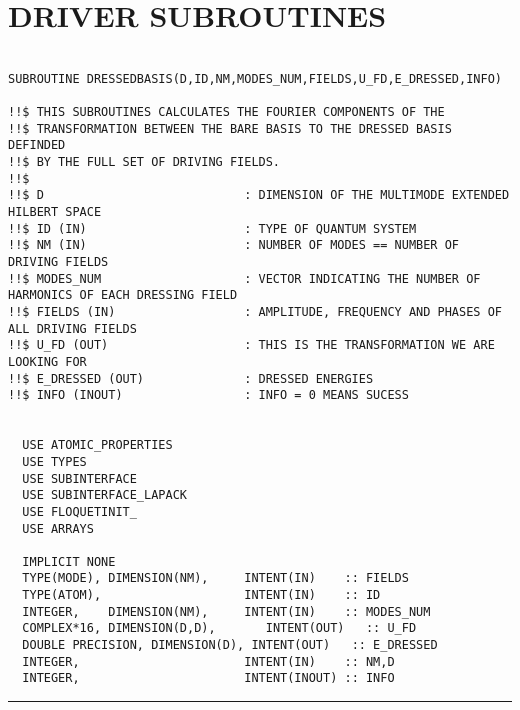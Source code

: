 \documentclass[10pt,a4paper]{article}
\begin{document}
\section{DRIVER SUBROUTINES}
\begin{verbatim}

SUBROUTINE DRESSEDBASIS(D,ID,NM,MODES_NUM,FIELDS,U_FD,E_DRESSED,INFO)

!!$ THIS SUBROUTINES CALCULATES THE FOURIER COMPONENTS OF THE 
!!$ TRANSFORMATION BETWEEN THE BARE BASIS TO THE DRESSED BASIS DEFINDED 
!!$ BY THE FULL SET OF DRIVING FIELDS.
!!$
!!$ D                            : DIMENSION OF THE MULTIMODE EXTENDED HILBERT SPACE
!!$ ID (IN)                      : TYPE OF QUANTUM SYSTEM
!!$ NM (IN)                      : NUMBER OF MODES == NUMBER OF DRIVING FIELDS
!!$ MODES_NUM                    : VECTOR INDICATING THE NUMBER OF HARMONICS OF EACH DRESSING FIELD
!!$ FIELDS (IN)                  : AMPLITUDE, FREQUENCY AND PHASES OF ALL DRIVING FIELDS
!!$ U_FD (OUT)                   : THIS IS THE TRANSFORMATION WE ARE LOOKING FOR
!!$ E_DRESSED (OUT)              : DRESSED ENERGIES
!!$ INFO (INOUT)                 : INFO = 0 MEANS SUCESS
               

  USE ATOMIC_PROPERTIES
  USE TYPES
  USE SUBINTERFACE
  USE SUBINTERFACE_LAPACK
  USE FLOQUETINIT_ 
  USE ARRAYS 

  IMPLICIT NONE
  TYPE(MODE), DIMENSION(NM),     INTENT(IN)    :: FIELDS
  TYPE(ATOM),                    INTENT(IN)    :: ID
  INTEGER,    DIMENSION(NM),     INTENT(IN)    :: MODES_NUM
  COMPLEX*16, DIMENSION(D,D),       INTENT(OUT)   :: U_FD
  DOUBLE PRECISION, DIMENSION(D), INTENT(OUT)   :: E_DRESSED
  INTEGER,                       INTENT(IN)    :: NM,D
  INTEGER,                       INTENT(INOUT) :: INFO

\end{verbatim}
\begin{center}
\rule{12cm}{1pt}
\end{center}
\end{document}
